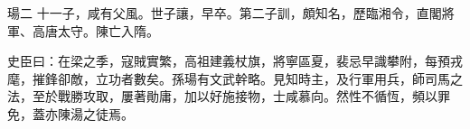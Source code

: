\begin{pinyinscope}
 瑒二
 十一子，咸有父風。世子讓，早卒。第二子訓，頗知名，歷臨湘令，直閣將軍、高唐太守。陳亡入隋。



 史臣曰：在梁之季，寇賊實繁，高祖建義杖旗，將寧區夏，裴忌早識攀附，每預戎麾，摧鋒卻敵，立功者數矣。孫瑒有文武幹略。見知時主，及行軍用兵，師司馬之法，至於戰勝攻取，屢著勛庸，加以好施接物，士咸慕向。然性不循恆，頻以罪免，蓋亦陳湯之徒焉。



\end{pinyinscope}